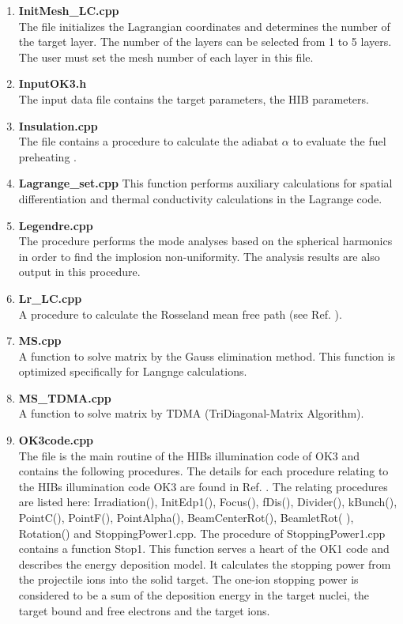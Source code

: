 \begin{enumerate}
\item {\bf InitMesh\_LC.cpp}\\
The file initializes the Lagrangian coordinates and determines the number of the target layer. The number of the layers can be selected from 1 to 5 layers. The user must set the mesh number of each layer in this file.
\item {\bf InputOK3.h}\\
The input data file contains the target parameters, the HIB parameters. %
\item {\bf Insulation.cpp}\\
The file contains a procedure to calculate the adiabat $\alpha$ to evaluate the fuel preheating \cite{CPC-O-SUKI, ICFBook}. 
\item {\bf Lagrange\_set.cpp}
This function performs auxiliary calculations for spatial differentiation and thermal conductivity calculations in the Lagrange code. 
\item {\bf Legendre.cpp}\\
The procedure performs the mode analyses based on the spherical harmonics in order to find the implosion non-uniformity. The analysis results are also output in this procedure. 
\item {\bf Lr\_LC.cpp}\\
A procedure to calculate the Rosseland mean free path (see Ref. \cite {Zeldovich}). 
\item {\bf MS.cpp}\\
A function to solve matrix by the Gauss elimination method. 
This function is optimized specifically for Langnge calculations.  
\item {\bf MS\_TDMA.cpp}\\
A function to solve matrix by TDMA (TriDiagonal-Matrix Algorithm).
\item {\bf OK3code.cpp}\\
The file is the main routine of the HIBs illumination code of OK3 and contains the following procedures\cite{ogoyski1,ogoyski2,ogoyski3}. The details for each procedure relating to the HIBs illumination code OK3 are found in Ref. \cite{CPC-O-SUKI, ogoyski1, ogoyski2, ogoyski3}. The relating procedures are listed here: Irradiation(), InitEdp1(), Focus(), fDis(), Divider(), kBunch(), PointC(), PointF(), PointAlpha(), BeamCenterRot(), BeamletRot( ), Rotation() and StoppingPower1.cpp. The procedure of StoppingPower1.cpp contains a function Stop1. This function serves a heart of the OK1 code \cite{ogoyski1} and describes the energy deposition model. It calculates the stopping power from the projectile ions into the solid target. The one-ion stopping power is considered to be a sum of the deposition energy in the target nuclei, the target bound and free electrons and the target ions\cite{mehlhorn}. 


\end{enumerate}

